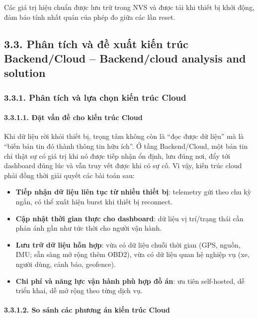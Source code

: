 \documentclass[a4paper]{extarticle}
\providecommand{\tightlist}{%
  \setlength{\itemsep}{0pt}\setlength{\parskip}{0pt}}
\begin{document}
Các giá trị hiệu chuẩn được lưu trữ trong NVS và được tải khi thiết bị
khởi động, đảm bảo tính nhất quán của phép đo giữa các lần reset.

\subsection{3.3. Phân tích và đề xuất kiến trúc Backend/Cloud --
Backend/cloud analysis and solution}\label{33-phan-tich-va-de-xuat-kien-truc-backend-cloud}

\subsubsection{3.3.1. Phân tích và lựa chọn kiến trúc Cloud}

\paragraph{3.3.1.1. Đặt vấn đề cho kiến trúc
Cloud}\label{3131-ux111ux1eb7t-vux1ea5n-ux111ux1ec1-cho-kiux1ebfn-truxfac-cloud}

Khi dữ liệu rời khỏi thiết bị, trọng tâm không còn là ``đọc được dữ
liệu'' mà là ``biến bản tin đó thành thông tin hữu ích''. Ở tầng
Backend/Cloud, một bản tin chỉ thật sự có giá trị khi nó được tiếp nhận
ổn định, lưu đúng nơi, đẩy tới dashboard đúng lúc và vẫn truy vết được
khi có sự cố. Vì vậy, kiến trúc cloud phải đồng thời giải quyết các bài
toán sau:

\begin{itemize}
\tightlist
\item
  \textbf{Tiếp nhận dữ liệu liên tục từ nhiều thiết bị}: telemetry gửi
  theo chu kỳ ngắn, có thể xuất hiện burst khi thiết bị reconnect.
\item
  \textbf{Cập nhật thời gian thực cho dashboard}: dữ liệu vị trí/trạng
  thái cần phản ánh gần như tức thời cho người vận hành.
\item
  \textbf{Lưu trữ dữ liệu hỗn hợp}: vừa có dữ liệu chuỗi thời gian (GPS,
  nguồn, IMU; sẵn sàng mở rộng thêm OBD2), vừa có dữ liệu quan hệ nghiệp
  vụ (xe, người dùng, cảnh báo, geofence).
\item
  \textbf{Chi phí và năng lực vận hành phù hợp đồ án}: ưu tiên
  self-hosted, dễ triển khai, dễ mở rộng theo từng dịch vụ.
\end{itemize}

\paragraph{3.3.1.2. So sánh các phương án kiến trúc
Cloud}\label{3132-so-suxe1nh-cuxe1c-phux1b0ux1a1ng-uxe1n-kiux1ebfn-truxfac-cloud}
\end{document}
